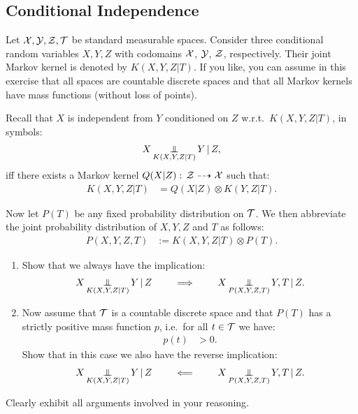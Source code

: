 \subsection{Conditional Independence}

Let $\mathcal{X},\mathcal{Y},\mathcal{Z},\mathcal{T}$ be standard measurable spaces.
Consider three conditional random variables $X,Y,Z$ with codomains $\mathcal{X}$, $\mathcal{Y}$, $\mathcal{Z}$, respectively.
Their joint Markov kernel is denoted by $K(X,Y,Z|T)$.
If you like, you can assume in this exercise that all spaces are countable discrete spaces and that all Markov kernels have mass functions
(without loss of points). 

Recall that $X$ is independent from $Y$ conditioned on $Z$ w.r.t.\ $K(X,Y,Z|T)$, in symbols:
\begin{align}
    X \operatorname*{\perp\mkern-11mu\perp}_{K(X,Y,Z|T)} Y \operatorname*{|} Z,
\end{align}
iff there exists a Markov kernel $Q(X|Z) :\, \mathcal{Z} \dashrightarrow \mathcal{X}$ such that:
\begin{align}
    K(X,Y,Z|T) &= Q(X|Z) \otimes K(Y,Z|T).
\end{align}

Now let $P(T)$ be any fixed probability distribution on $\mathcal{T}$.
We then abbreviate the joint probability distribution of $X,Y,Z$ and $T$ as follows:
\begin{align}
    P(X,Y,Z,T) &:= K(X,Y,Z|T) \otimes P(T).
\end{align}


\begin{enumerate}[label=\alph*)]
    \item Show that we always have the implication: 
      \begin{align}
            X \operatorname*{\perp\mkern-11mu\perp}_{K(X,Y,Z|T)} Y \operatorname*{|} Z \qquad \implies \qquad X \operatorname*{\perp\mkern-11mu\perp}_{P(X,Y,Z,T)} Y,T \operatorname*{|} Z.
      \end{align}
  \item  Now assume that $\mathcal{T}$ is a countable discrete space and that $P(T)$ has a strictly positive mass function $p$, i.e.\ for all $t \in \mathcal{T}$ we have: 
\begin{align}
    p(t) & >0.
\end{align}
        Show that in this case we also have the reverse implication:
      \begin{align}
            X \operatorname*{\perp\mkern-11mu\perp}_{K(X,Y,Z|T)} Y \operatorname*{|} Z \qquad \impliedby \qquad X \operatorname*{\perp\mkern-11mu\perp}_{P(X,Y,Z,T)} Y,T \operatorname*{|} Z.
      \end{align}
\end{enumerate}   
Clearly exhibit all arguments involved in your reasoning. 


